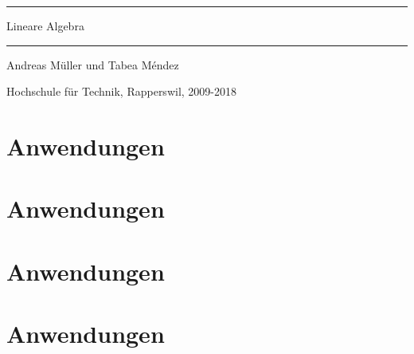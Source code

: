 \documentclass[a4paper,12pt]{book}
\begin{document}
\pagestyle{fancy}
\frontmatter
\newcommand\HRule{\noindent\rule{\linewidth}{1.5pt}}
\begin{titlepage}
\HRule
\vspace*{10pt}
\begin{flushright}
{\Huge
Lineare Algebra}
\end{flushright}
\HRule
\begin{flushright}
\vspace{30pt}
\LARGE
Andreas Müller
und
Tabea Méndez
\end{flushright}
\begin{center}
Hochschule für Technik, Rapperswil, 2009-2018
\end{center}
\end{titlepage}
\hypersetup{
    linktoc=all,
    linkcolor=blue
}
\tableofcontents
\newtheorem{satz}{Satz}[chapter]
\newtheorem{hilfssatz}[satz]{Hilfssatz}
\newtheorem{definition}[satz]{Definition}
\newtheorem{annahme}[satz]{Annahme}
\newtheorem{aufgabe}[satz]{Aufgabe}
\newenvironment{beispiel}[1][Beispiel]{%
\begin{proof}[\bf #1]%
\renewcommand{\qedsymbol}{$\bigcirc$}%
}{\end{proof}}
\mainmatter



\section{Anwendungen}



\section{Anwendungen}


%

\section{Anwendungen}







%
%
%
%

\section{Anwendungen}

\vfill
\pagebreak
\ifodd\value{page}\else\null\clearpage\fi

\appendix
\end{document}
